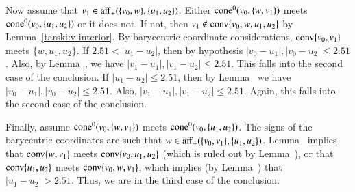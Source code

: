 \begin{tarskidata}
\begin{tarski}
\begin{proved}
Now assume that
$v_1\in {\operatorname{aff}}_+(\{v_0,w\},\{u_1,u_2\})$. 
Either ${\operatorname{cone}}^0(v_0,\{w,v_1\})$ meets ${\operatorname{cone}}^0(v_0,\{u_1,u_2\})$
or it does not.  If not, then
$v_1\not\in{\operatorname{conv}}\{v_0,w,u_1,u_2\}$ by Lemma~\ref{tarski:v-interior}.
By barycentric coordinate considerations, ${\operatorname{conv}}\{v_0,v_1\}$ meets $\{w,u_1,u_2\}$.
If $2.51 < |u_1-u_2|$, then by hypothesis $|v_0-u_1|,|v_0-u_2|\le 2.51$.  Also, by
Lemma~, we have $|v_1-u_1|,|v_1-u_2|\le 2.51$.  This falls into the second case
of the conclusion.  If $|u_1-u_2|\le 2.51$, then by Lemma~ %
we have $|v_0-u_1|,|v_0-u_2|\le 2.51$.  Also, $|v_1-u_1|,|v_1-u_2|\le 2.51$.  Again,
this falls into the second case of the conclusion.

Finally, assume ${\operatorname{cone}}^0(v_0,\{w,v_1\})$ meets ${\operatorname{cone}}^0(v_0,\{u_1,u_2\})$.
The signs of the barycentric coordinates are such that $w\in{\operatorname{aff}}_+(\{v_0,v_1\},\{u_1,u_2\})$.
Lemma~ implies that ${\operatorname{conv}}\{w,v_1\}$ meets ${\operatorname{conv}}\{v_0,u_1,u_2\}$ 
(which is ruled out by Lemma~), or that ${\operatorname{conv}}\{u_1,u_2\}$ meets ${\operatorname{conv}}\{v_0,w,v_1\}$,
which implies (by Lemma~) that $|u_1-u_2|>2.51$.  Thus, we are in the third case of the conclusion.



 
%
\swallowed\end{proved}
\end{tarski}






\begin{tarski}


\end{tarski}
\end{tarskidata}
